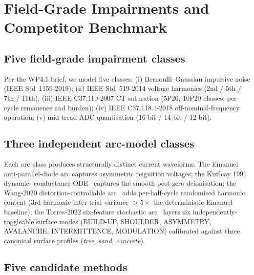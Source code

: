 \documentclass[journal]{IEEEtran}
\begin{document}
\section{Field-Grade Impairments and Competitor Benchmark}\label{sec:bench}

\subsection{Five field-grade impairment classes}
Per the WP4.1 brief, we model five classes:
(i) Bernoulli--Gaussian impulsive noise
    (IEEE Std~1159-2019);
(ii) IEEE Std~519-2014 voltage harmonics (2nd / 5th / 7th / 11th);
(iii) IEEE C37.110-2007 CT saturation (5P20, 10P20 classes; per-
    cycle remanence and burden);
(iv) IEEE C37.118.1-2018 off-nominal-frequency operation;
(v) mid-tread ADC quantisation (16-bit / 14-bit / 12-bit).

\subsection{Three independent arc-model classes}
Each arc class produces structurally distinct current
waveforms.  The Emanuel anti-parallel-diode arc captures
asymmetric reignition voltages; the Kizilcay 1991 dynamic-
conductance ODE~\cite{Kizilcay1991ETEP} captures the smooth
post-zero deionisation; the Wang-2020 distortion-controllable
arc~\cite{Wang2020TPWRD} adds per-half-cycle randomised
harmonic content (3rd-harmonic inter-trial variance $> 5\times$
the deterministic Emanuel baseline); the Torres-2022 six-feature
stochastic arc~\cite{Torres2022EPSR,Santos2022EPSR} layers six
independently-toggleable surface modes (BUILD-UP, SHOULDER,
ASYMMETRY, AVALANCHE, INTERMITTENCE, MODULATION) calibrated
against three canonical surface profiles
(\textit{tree}, \textit{sand}, \textit{concrete}).

\subsection{Five candidate methods}
\end{document}
